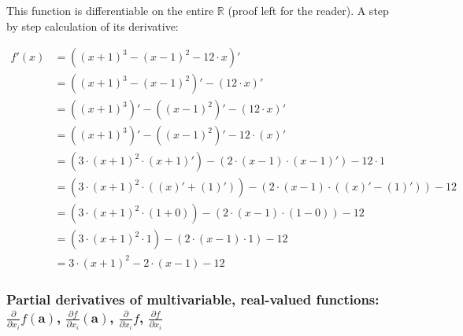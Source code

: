 \documentclass[titlepage]{article}
\begin{document}
            This function is differentiable on the entire $\mathbb{R}$ (proof
            left for the reader). A step by step calculation of its derivative:

            \begin{align*}
              f'(x) & = \left( (x+1)^3 - (x-1)^2 - 12 \cdot x \right)' \\
                    & = \left( (x+1)^3 - (x-1)^2 \right)' - (12 \cdot x)' \\
                    & = \left( (x+1)^3 \right)'
                        -
                        \left( (x-1)^2 \right)'
                        - (12 \cdot x)' \\
                    & = \left( (x+1)^3 \right)'
                        -
                        \left( (x-1)^2 \right)'
                        - 12 \cdot (x)' \\
                    & = \left( 3 \cdot (x+1)^2 \cdot (x+1)' \right)
                        -
                        \left( 2 \cdot (x-1) \cdot (x-1)' \right)
                        - 12 \cdot 1 \\
                    & = \left(
                          3 \cdot (x+1)^2 \cdot \left( (x)' + (1)' \right)
                        \right)
                        -
                        \left(
                          2 \cdot (x-1) \cdot \left( (x)' - (1)' \right)
                        \right)
                        - 12 \\
                    & = \left(
                          3 \cdot (x+1)^2 \cdot \left( 1 + 0 \right)
                        \right)
                        -
                        \left(
                          2 \cdot (x-1) \cdot \left( 1 - 0 \right)
                        \right)
                        - 12 \\
                    & = \left( 3 \cdot (x+1)^2 \cdot 1 \right)
                        -
                        \left( 2 \cdot (x-1) \cdot 1 \right)
                        - 12 \\
                    & = 3 \cdot (x+1)^2 - 2 \cdot (x-1) - 12
            \end{align*}

        \subsubsection{%
          Partial derivatives of multivariable, real-valued functions:
          $\frac{\partial}{\partial x_i} f(\mathbf{a})$,
          $\frac{\partial f}{\partial x_i} (\mathbf{a})$,
          $\frac{\partial}{\partial x_i} f$,
          $\frac{\partial f}{\partial x_i}$
        }
\end{document}
